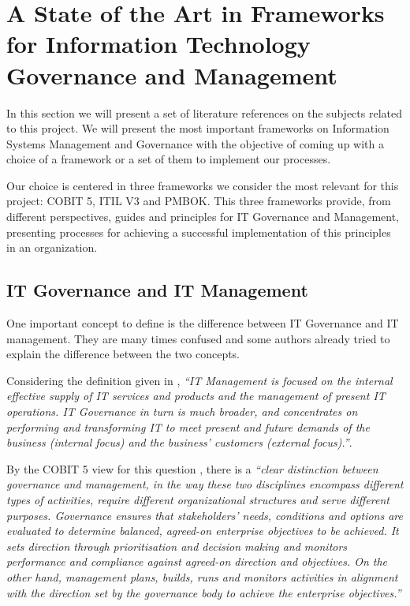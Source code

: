 
% 
% 


\section{A State of the Art in Frameworks for Information Technology Governance and Management}

In this section we will present a set of literature references on the subjects related to this project. We will present the most important frameworks on Information Systems Management and Governance with the objective of coming up with a choice of a framework or a set of them to implement our processes.\par
Our choice is centered in three frameworks we consider the most relevant for this project: COBIT 5, ITIL V3 and PMBOK. This three frameworks provide, from different perspectives, guides and principles for IT Governance and Management, presenting processes for achieving a successful implementation of this principles in an organization.

\subsection{IT Governance and IT Management}

One important concept to define is the difference between IT Governance and IT management. They are many times confused and some authors already tried to explain the difference between the two concepts.\par
Considering the definition given in \cite{ITGovAndMech}, \textit{``IT Management is focused on the internal effective supply of IT services and products and the management of present IT operations. IT Governance in turn is much broader, and concentrates on performing and transforming IT to meet present and future demands of the business (internal focus) and the business' customers (external focus).''}.\par
 By the COBIT 5 view for this question \cite{2012cobit}, there is a \textit{``clear distinction between governance and management, in the way these two disciplines encompass different types of activities, require different organizational structures and serve different purposes. Governance ensures that stakeholders' needs, conditions and options are evaluated to determine balanced, agreed-on enterprise objectives to be achieved. It sets direction through prioritisation and decision making and monitors performance and compliance against agreed-on direction and objectives. On the other hand, management plans, builds, runs and monitors activities in alignment with the direction set by the governance body to achieve the enterprise objectives.''}\par


